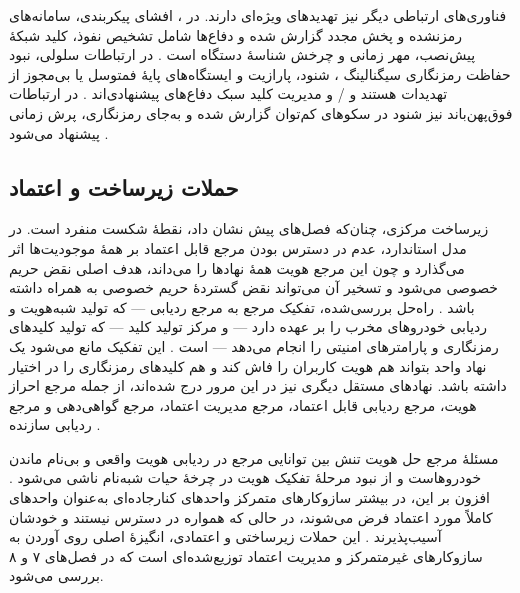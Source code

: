 فناوری‌های ارتباطی دیگر نیز تهدیدهای ویژه‌ای دارند. در ، افشای پیکربندی، سامانه‌های رمزنشده و پخش مجدد گزارش شده و دفاع‌ها شامل تشخیص نفوذ، کلید شبکهٔ پیش‌نصب، مهر زمانی و چرخش شناسهٔ دستگاه است \cite{farsimadanReviewSecurityChallenges2025}. در ارتباطات سلولی، نبود حفاظت رمزنگاری سیگنالینگ ، شنود، پارازیت و ایستگاه‌های پایهٔ فمتوسل یا بی‌مجوز از تهدیدات هستند و / و مدیریت کلید سبک دفاع‌های پیشنهادی‌اند \cite{farsimadanReviewSecurityChallenges2025}. در ارتباطات فوق‌پهن‌باند نیز شنود در سکوهای کم‌توان گزارش شده و به‌جای رمزنگاری، پرش زمانی پیشنهاد می‌شود \cite{farsimadanReviewSecurityChallenges2025}.

\subsection{حملات زیرساخت و اعتماد}

زیرساخت مرکزی، چنان‌که فصل‌های پیش نشان داد، نقطهٔ شکست منفرد  است. در مدل استاندارد، عدم در دسترس بودن مرجع قابل اعتماد بر همهٔ موجودیت‌ها اثر می‌گذارد و چون این مرجع هویت همهٔ نهادها را می‌داند، هدف اصلی نقض حریم خصوصی می‌شود و تسخیر آن می‌تواند نقض گستردهٔ حریم خصوصی به همراه داشته باشد \cite{rahmawatiagustinaSystematicLiteratureReview2025}. راه‌حل بررسی‌شده، تفکیک مرجع به مرجع ردیابی  — که تولید شبه‌هویت و ردیابی خودروهای مخرب را بر عهده دارد — و مرکز تولید کلید  — که تولید کلیدهای رمزنگاری و پارامترهای امنیتی را انجام می‌دهد — است \cite{rahmawatiagustinaSystematicLiteratureReview2025}. این تفکیک مانع می‌شود یک نهاد واحد بتواند هم هویت کاربران را فاش کند و هم کلیدهای رمزنگاری را در اختیار داشته باشد. نهادهای مستقل دیگری نیز در این مرور درج شده‌اند، از جمله مرجع احراز هویت، مرجع ردیابی قابل اعتماد، مرجع مدیریت اعتماد، مرجع گواهی‌دهی و مرجع ردیابی سازنده \cite{rahmawatiagustinaSystematicLiteratureReview2025}.

مسئلهٔ مرجع حل هویت  تنش بین توانایی مرجع در ردیابی هویت واقعی و بی‌نام ماندن خودروهاست و از نبود مرحلهٔ تفکیک هویت در چرخهٔ حیات شبه‌نام ناشی می‌شود \cite{rahmawatiagustinaSystematicLiteratureReview2025}. افزون بر این، در بیشتر سازوکارهای متمرکز واحدهای کنارجاده‌ای به‌عنوان واحدهای کاملاً مورد اعتماد فرض می‌شوند، در حالی که همواره در دسترس نیستند و خودشان آسیب‌پذیرند \cite{farsimadanReviewSecurityChallenges2025}. این حملات زیرساختی و اعتمادی، انگیزهٔ اصلی روی آوردن به سازوکارهای غیرمتمرکز و مدیریت اعتماد توزیع‌شده‌ای است که در فصل‌های ۷ و ۸ بررسی می‌شود.
